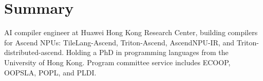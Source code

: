 \section{Summary}
AI compiler engineer at Huawei Hong Kong Research Center, building compilers
for Ascend NPUs: TileLang-Ascend, Triton-Ascend, \mbox{AscendNPU-IR}, and
Triton-distributed-ascend.
Holding a PhD in programming languages from the University of Hong Kong.
Program committee service includes ECOOP, OOPSLA, POPL, and PLDI.
